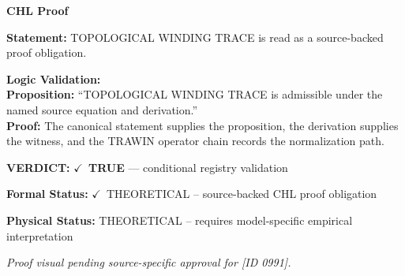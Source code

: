 \vspace{0.45em}
\noindent\textbf{CHL Proof}\par
\textbf{Statement:} TOPOLOGICAL WINDING TRACE is read as a source-backed proof obligation.

\textbf{Logic Validation:}\\
\textbf{Proposition:} ``TOPOLOGICAL WINDING TRACE is admissible under the named source equation and derivation.''\\
\textbf{Proof:} The canonical statement supplies the proposition, the derivation supplies the witness, and the TRAWIN operator chain records the normalization path.

\textbf{VERDICT:} \ensuremath{\checkmark}\ \textbf{TRUE} --- conditional registry validation

\textbf{Formal Status:} \ensuremath{\checkmark}\ THEORETICAL -- source-backed CHL proof obligation

\textbf{Physical Status:} THEORETICAL -- requires model-specific empirical interpretation
\par\vspace{0.45em}
\par
\vfill
\begingroup\footnotesize\itshape
Proof visual pending source-specific approval for [ID 0991].
\par\endgroup
\vfill
\endgroup
\endgroup
